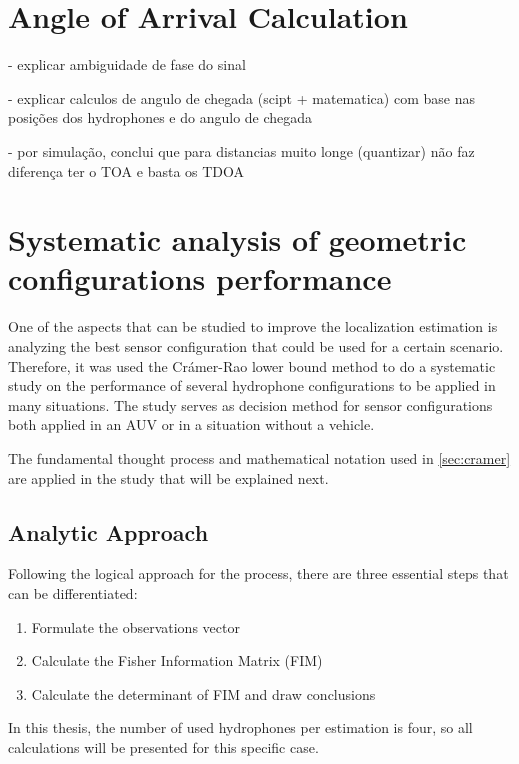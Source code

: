 \section{Angle of Arrival Calculation}

- explicar ambiguidade de fase do sinal

- explicar calculos de angulo de chegada (scipt + matematica) com base nas posições dos hydrophones e do angulo de chegada

- por simulação, conclui que para distancias muito longe (quantizar) não faz diferença ter o TOA e basta os TDOA


\section{Systematic analysis of geometric configurations performance} \label{sec:config-perf}

One of the aspects that can be studied to improve the localization estimation is analyzing the best sensor configuration that could be used for a certain scenario. Therefore, it was used the Crámer-Rao lower bound method to do a systematic study on the performance of several hydrophone configurations to be applied in many situations. The study serves as decision method for sensor configurations both applied in an AUV or in a situation without a vehicle. 

The fundamental thought process and mathematical notation used in \ref{sec:cramer} are applied in the study that will be explained next.

\subsection{Analytic Approach}  

Following the logical approach for the process, there are three essential steps that can be differentiated:

\begin{enumerate}
	
	\item Formulate the observations vector
	\item Calculate the Fisher Information Matrix (FIM)
	\item Calculate the determinant of FIM and draw conclusions
	
\end{enumerate}

In this thesis, the number of used hydrophones per estimation is four, so all calculations will be presented for this specific case.

